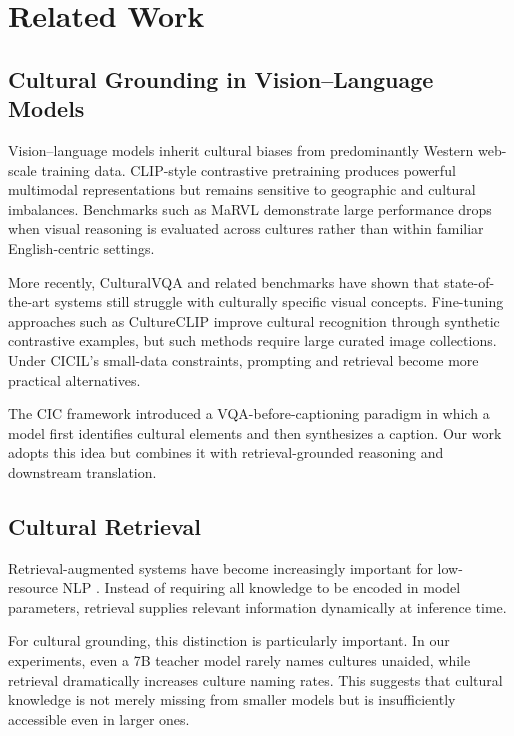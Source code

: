 \documentclass[11pt]{article}
\begin{document}
\section{Related Work}

\subsection{Cultural Grounding in Vision--Language Models}
Vision--language models inherit cultural biases from predominantly Western
web-scale training data. CLIP-style contrastive pretraining
\citep{radford2021clip} produces powerful multimodal representations but
remains sensitive to geographic and cultural imbalances. Benchmarks such as
MaRVL \citep{liu2021marvl} demonstrate large performance drops when visual
reasoning is evaluated across cultures rather than within familiar
English-centric settings.

More recently, CulturalVQA \citep{nayak2024culturalvqa} and related
benchmarks \citep{romero2024cvqa} have shown that state-of-the-art systems
still struggle with culturally specific visual concepts. Fine-tuning
approaches such as CultureCLIP \citep{huang2025cultureclip} improve cultural
recognition through synthetic contrastive examples, but such methods require
large curated image collections. Under CICIL's small-data constraints,
prompting and retrieval become more practical alternatives.

The CIC framework \citep{yun2024cic} introduced a VQA-before-captioning
paradigm in which a model first identifies cultural elements and then
synthesizes a caption. Our work adopts this idea but combines it with
retrieval-grounded reasoning and downstream translation.

\subsection{Cultural Retrieval}
Retrieval-augmented systems have become increasingly important for
low-resource NLP \citep{lewis2020rag}. Instead of requiring all knowledge to
be encoded in model parameters, retrieval supplies relevant information
dynamically at inference time.

For cultural grounding, this distinction is particularly important. In our
experiments, even a 7B teacher model rarely names cultures unaided, while
retrieval dramatically increases culture naming rates. This suggests that
cultural knowledge is not merely missing from smaller models but is
insufficiently accessible even in larger ones.
\end{document}
